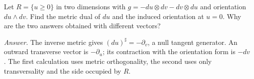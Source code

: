 \begin{exercise}
Let $R=\{u\geq0\}$ in two dimensions with $g=-du\otimes dv-dv\otimes du$ and orientation $du\wedge dv$. Find the metric dual of $du$ and the induced orientation at $u=0$. Why are the two answers obtained with different vectors?

\emph{Answer.} The inverse metric gives $(du)^\sharp=-\partial_v$, a null tangent generator. An outward transverse vector is $-\partial_u$; its contraction with the orientation form is $-dv$. The first calculation uses metric orthogonality, the second uses only transversality and the side occupied by $R$.
\end{exercise}
